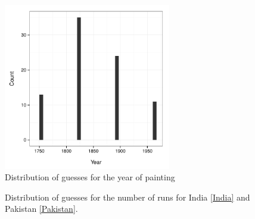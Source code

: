 \documentclass{article}
\begin{document}
\begin{figure}
\begin{center}
\includegraphics[width=0.65\textwidth]{../../output/inClass_exp/painting.pdf}
\caption{Distribution of guesses for the year of painting}
\label{painting}
\end{center}	
\end{figure}





\begin{figure}[ht!]
     \begin{center}
    \end{center}
    \caption{Distribution of guesses for the number of runs for India \ref{India} and Pakistan \ref{Pakistan}.}
\end{figure}
\end{document}
